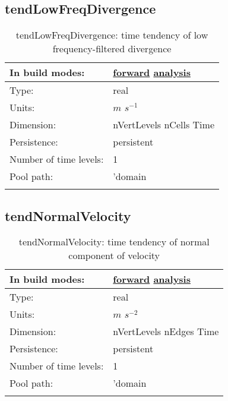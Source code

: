 \subsection[tendLowFreqDivergence]{tendLowFreqDivergence}
\label{subsec:var_sec_tend_tendLowFreqDivergence}
\begin{center}
\begin{longtable}{| p{2.0in} | p{4.0in} |}
        \hline 
        In build modes: & \hyperref[subsec:forward_var_tab_tend]{forward} \hyperref[subsec:analysis_var_tab_tend]{analysis} \\
        \hline 
        Type: & real \\
        \hline 
        Units: & $m$ $s^{-1}$ \\
        \hline 
        Dimension: & nVertLevels nCells Time \\
        \hline 
        Persistence: & persistent \\
        \hline 
        Number of time levels: & 1 \\
        \hline 
            Pool path: & 'domain %
 \\
		 \hline 
    \caption{tendLowFreqDivergence: time tendency of low frequency-filtered divergence}
\end{longtable}
\end{center}
\subsection[tendNormalVelocity]{tendNormalVelocity}
\label{subsec:var_sec_tend_tendNormalVelocity}
\begin{center}
\begin{longtable}{| p{2.0in} | p{4.0in} |}
        \hline 
        In build modes: & \hyperref[subsec:forward_var_tab_tend]{forward} \hyperref[subsec:analysis_var_tab_tend]{analysis} \\
        \hline 
        Type: & real \\
        \hline 
        Units: & $m$ $s^{-2}$ \\
        \hline 
        Dimension: & nVertLevels nEdges Time \\
        \hline 
        Persistence: & persistent \\
        \hline 
        Number of time levels: & 1 \\
        \hline 
            Pool path: & 'domain %
 \\
		 \hline 
    \caption{tendNormalVelocity: time tendency of normal component of velocity}
\end{longtable}
\end{center}
